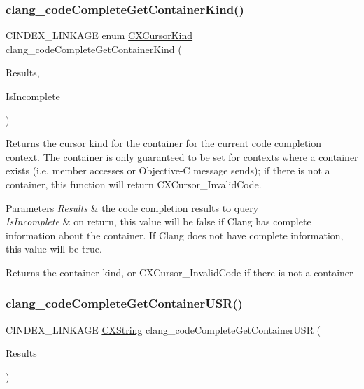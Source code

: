 \subsubsection{\texorpdfstring{clang\+\_\+code\+Complete\+Get\+Container\+Kind()}{clang\_codeCompleteGetContainerKind()}}
{\footnotesize\ttfamily C\+I\+N\+D\+E\+X\+\_\+\+L\+I\+N\+K\+A\+GE enum \hyperlink{group__CINDEX_gaaccc432245b4cd9f2d470913f9ef0013}{C\+X\+Cursor\+Kind} clang\+\_\+code\+Complete\+Get\+Container\+Kind (\begin{DoxyParamCaption}\item[{\hyperlink{structCXCodeCompleteResults}{C\+X\+Code\+Complete\+Results} $\ast$}]{Results,  }\item[{unsigned $\ast$}]{Is\+Incomplete }\end{DoxyParamCaption})}



Returns the cursor kind for the container for the current code completion context. The container is only guaranteed to be set for contexts where a container exists (i.\+e. member accesses or Objective-\/C message sends); if there is not a container, this function will return C\+X\+Cursor\+\_\+\+Invalid\+Code. 


\begin{DoxyParams}{Parameters}
{\em Results} & the code completion results to query\\
\hline
{\em Is\+Incomplete} & on return, this value will be false if Clang has complete information about the container. If Clang does not have complete information, this value will be true.\\
\hline
\end{DoxyParams}
\begin{DoxyReturn}{Returns}
the container kind, or C\+X\+Cursor\+\_\+\+Invalid\+Code if there is not a container 
\end{DoxyReturn}
\mbox{\label{group__CINDEX__CODE__COMPLET_gaf45d7f61268af6ec88c70a6fc69d5818}} 
\subsubsection{\texorpdfstring{clang\+\_\+code\+Complete\+Get\+Container\+U\+S\+R()}{clang\_codeCompleteGetContainerUSR()}}
{\footnotesize\ttfamily C\+I\+N\+D\+E\+X\+\_\+\+L\+I\+N\+K\+A\+GE \hyperlink{structCXString}{C\+X\+String} clang\+\_\+code\+Complete\+Get\+Container\+U\+SR (\begin{DoxyParamCaption}\item[{\hyperlink{structCXCodeCompleteResults}{C\+X\+Code\+Complete\+Results} $\ast$}]{Results }\end{DoxyParamCaption})}



